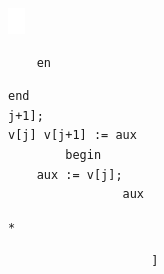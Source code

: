 \documentclass[10pt]{article}
\begin{document}
\begin{center}
\includegraphics[max width=\textwidth]{2025_04_17_46e04c6acd873ea9558dg-155}
\end{center}

\begin{verbatim}
    en
\end{verbatim}

\begin{verbatim}
end
j+1];
v[j] v[j+1] := aux
        begin
    aux := v[j];
                aux
\end{verbatim}

\begin{verbatim}
*
\end{verbatim}

\begin{verbatim}
                    ]
\end{verbatim}
\end{document}
